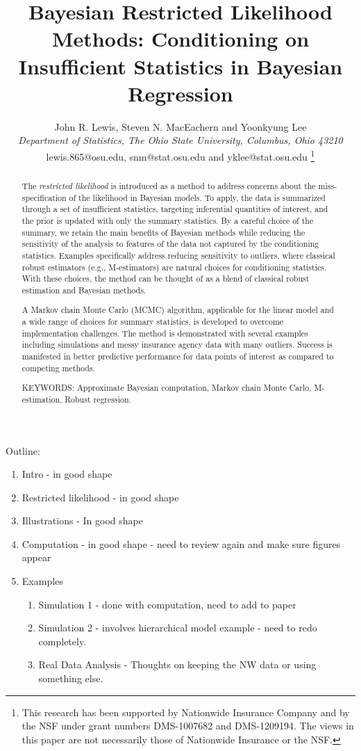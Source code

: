 \documentclass[11pt]{article}
\title{Bayesian Restricted Likelihood Methods: Conditioning on Insufficient Statistics in Bayesian Regression}
\author{John R. Lewis, Steven N. MacEachern and  Yoonkyung Lee \\
{\small \it Department of Statistics, The Ohio State University, Columbus, Ohio 43210}\\
{\small lewis.865@osu.edu, snm@stat.osu.edu and yklee@stat.osu.edu}
\thanks{This research has been supported by Nationwide Insurance Company and by the NSF under grant numbers DMS-1007682 and DMS-1209194.  The views in this paper are not necessarily those of Nationwide Insurance or the NSF.}}
\begin{document}
\date{}
\maketitle

\begin{abstract}
The \textit{restricted likelihood} is introduced as a method to address concerns about the miss-specification of the likelihood in Bayesian models. To apply, the data is summarized through a set of insufficient statistics,
targeting inferential quantities of interest, and the prior is updated with only the summary statistics. By a careful choice of the summary, we retain the main benefits of Bayesian methods while reducing the
sensitivity of the analysis to features of the data not captured by
the conditioning statistics. Examples specifically address reducing sensitivity to outliers,
where classical robust estimators (e.g., M-estimators) are natural choices
for conditioning statistics. With these choices, the method can be thought of as a blend of classical robust estimation and Bayesian methods. 

A Markov chain Monte Carlo (MCMC) algorithm, applicable for the linear model and a wide range of choices for
summary statistics, is developed to overcome implementation challenges. The method is demonstrated with several examples including simulations and messy insurance agency data with many outliers. Success is manifested in better predictive
performance for data points of interest as compared to competing methods.

\noindent KEYWORDS: Approximate Bayesian computation, Markov chain
Monte Carlo, M-estimation, Robust regression.


\end{abstract}

Outline:
\begin{enumerate}
\item Intro - in good shape
\item Restricted likelihood - in good shape
\item Illustrations - In good shape
\item Computation - in good shape - need to review again and make sure figures appear
\item Examples
\begin{enumerate}
\item Simulation 1 - done with computation, need to add to paper
\item Simulation 2 - involves hierarchical model example - need to redo completely.
\item Real Data Analysis - Thoughts on keeping the NW data or using something else.
\end{enumerate}

\end{enumerate}
\end{document}
